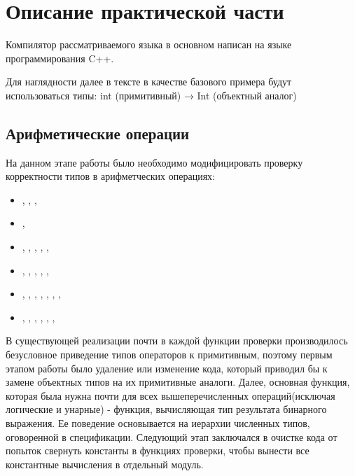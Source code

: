 \section{Описание практической части}
\label{sec:Chapter4} 

Компилятор рассматриваемого языка в основном написан на языке программирования C++.

Для наглядности далее в тексте в качестве базового примера будут использоваться типы:
int (примитивный) → Int (объектный аналог)

\subsection{Арифметические операции}
На данном этапе работы было необходимо модифицировать проверку корректности типов в арифметческих операциях:
\begin{itemize}[label={}]
    \item \code{+} , \code{-} , \code{+=} , \code{-=}
    \item \code{++} , \code{--}
    \item \code{*} , \code{/} , \code{\%} , \code{*=}, \code{/=}, \code{\%=}
    \item \code{$\langle \langle$} , \code{$\rangle \rangle$} , \code{$\langle \langle$=} , \code{$\rangle \rangle$=}, \code{$\rangle \rangle \rangle$}, \code{$\rangle \rangle \rangle$=}
    \item \code{|} , \code{|=} , \code{\&} , \code{\&=}, \code{\^}, \code{\^}\code{=}, \code{||} , \code{\&\&}
    \item \code{<} , \code{<=} , \code{>}, \code{>=}, \code{==}, \code{===}, \code{!}
\end{itemize}

В существующей реализации почти в каждой функции проверки производилось безусловное приведение типов операторов к примитивным, поэтому первым этапом работы было удаление или изменение кода, который приводил бы к замене объектных типов на их примитивные аналоги. Далее, основная функция, которая была нужна почти для всех вышеперечисленных операций(исключая логические и унарные) - функция, вычисляющая тип результата бинарного выражения. Ее поведение основывается на иерархии численных типов, оговоренной в спецификации.
Следующий этап заключался в очистке кода от попыток свернуть константы в функциях проверки, чтобы вынести все константные вычисления в отдельный модуль.


